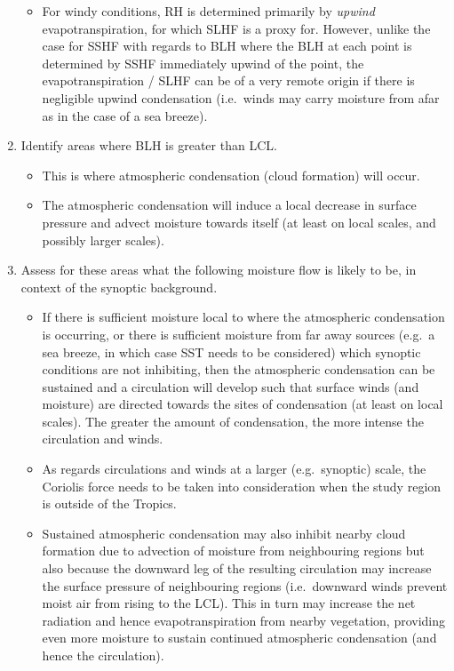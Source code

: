\begin{enumerate}
\begin{itemize}
		\item For windy conditions, \ac{RH} is determined primarily by \textit{upwind} evapotranspiration, for which \ac{SLHF} is a proxy for. However, unlike the case for \ac{SSHF} with regards to \ac{BLH} where the \ac{BLH} at each point is determined by \ac{SSHF} immediately upwind of the point, the evapotranspiration / \ac{SLHF} can be of a very remote origin if there is negligible upwind condensation (i.e.\ winds may carry moisture from afar as in the case of a sea breeze).
	\end{itemize}
	\item Identify areas where \ac{BLH} is greater than \ac{LCL}.
	\begin{itemize}
		\item This is where atmospheric condensation (cloud formation) will occur.
		\item The atmospheric condensation will induce a local decrease in surface pressure and advect moisture towards itself (at least on local scales, and possibly larger scales).
	\end{itemize}
	\item Assess for these areas what the following moisture flow is likely to be, in context of the synoptic background.
	\begin{itemize}
		\item If there is sufficient moisture local to where the atmospheric condensation is occurring, or there is sufficient moisture from far away sources (e.g.\ a sea breeze, in which case \ac{SST} needs to be considered) which synoptic conditions are not inhibiting, then the atmospheric condensation can be sustained and a circulation will develop such that surface winds (and moisture) are directed towards the sites of condensation (at least on local scales). The greater the amount of condensation, the more intense the circulation and winds.
		\item As regards circulations and winds at a larger (e.g.\ synoptic) scale, the Coriolis force needs to be taken into consideration when the study region is outside of the Tropics.
		\item Sustained atmospheric condensation may also inhibit nearby cloud formation due to advection of moisture from neighbouring regions but also because the downward leg of the resulting circulation may increase the surface pressure of neighbouring regions (i.e.\ downward winds prevent moist air from rising to the \ac{LCL}). This in turn may increase the net radiation and hence evapotranspiration from nearby vegetation, providing even more moisture to sustain continued atmospheric condensation (and hence the circulation).

\end{itemize}
\end{enumerate}
